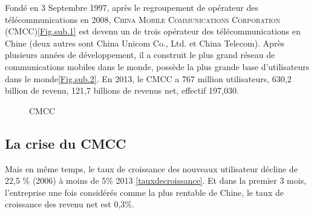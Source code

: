 Fondé en 3 Septembre 1997, après le regroupement de opérateur des télécommunications en 2008, \textsc{China Mobile Communications Corporation} (\textsf{CMCC})\ref{Fig.sub.1} est devenu un de trois opérateur des télécommunications en Chine (deux autres sont \textsf{China Unicom Co., Ltd.} et \textsf{China Telecom}). Après plusieurs années de développement, il a construit le plus grand réseau de communications mobiles dans le monde, possède la plus grande base d'utilisateurs dans le monde\ref{Fig.sub.2}. En 2013, le CMCC a 767 million utilisateurs, 630,2 billion \textyen \qquad de revenu, 121,7 billions \textyen de revenus net, effectif 197,030.
\begin{figure}[H]
	\flushleft
	\hfill
	\hspace{1in}
	\caption{CMCC} 
\end{figure}

\subsection{La crise du CMCC}
Mais en même temps, le taux de croissance des nouveaux utilisateur décline de 22,5 \% (2006) à moins de 5\% 2013 \ref{tauxdecroissance}. Et dans la premier 3 mois, l'entreprise une fois considérés comme la plus rentable de Chine, le taux de croissance des revenu net est 0,3\%.

